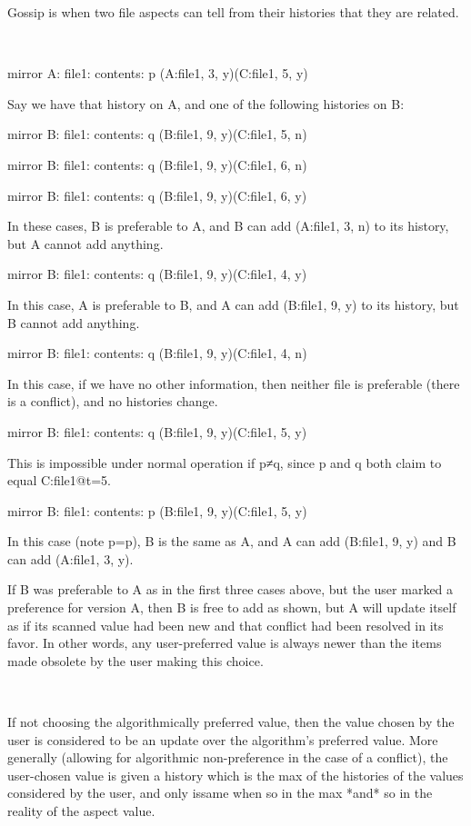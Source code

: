 \documentclass{book}
\begin{document}
Gossip is when two file aspects can tell from their histories that they are related.

~

	mirror A: file1: contents: p (A:file1, 3, y)(C:file1, 5, y)

Say we have that history on A, and one of the following histories on B:

	mirror B: file1: contents: q (B:file1, 9, y)(C:file1, 5, n)

	mirror B: file1: contents: q (B:file1, 9, y)(C:file1, 6, n)

	mirror B: file1: contents: q (B:file1, 9, y)(C:file1, 6, y)

In these cases, B is preferable to A, and B can add (A:file1, 3, n) to its history, but A cannot add anything.

	mirror B: file1: contents: q (B:file1, 9, y)(C:file1, 4, y)

In this case, A is preferable to B, and A can add (B:file1, 9, y) to its history, but B cannot add anything.

	mirror B: file1: contents: q (B:file1, 9, y)(C:file1, 4, n)

In this case, if we have no other information, then neither file is preferable (there is a conflict), and no histories change.

	mirror B: file1: contents: q (B:file1, 9, y)(C:file1, 5, y)

This is impossible under normal operation if p≠q, since p and q both claim to equal C:file1@t=5.

	mirror B: file1: contents: p (B:file1, 9, y)(C:file1, 5, y)

In this case (note p=p), B is the same as A, and A can add (B:file1, 9, y) and B can add (A:file1, 3, y).

If B was preferable to A as in the first three cases above, but the user marked a preference for version A, then B is free to add as shown, but A will update itself as if its scanned value had been new and that conflict had been resolved in its favor.  In other words, any user-preferred value is always newer than the items made obsolete by the user making this choice.

~

If not choosing the algorithmically preferred value, then the value chosen by the user is considered to be an update over the algorithm's preferred value.  More generally (allowing for algorithmic non-preference in the case of a conflict), the user-chosen value is given a history which is the max of the histories of the values considered by the user, and only issame when so in the max *and* so in the reality of the aspect value.
\end{document}
